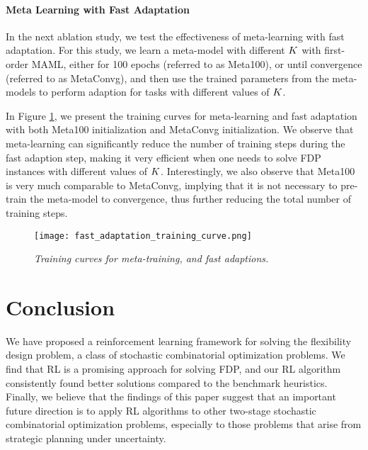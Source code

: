 \documentclass{article} %
\begin{document}
\paragraph{Meta Learning with Fast Adaptation}
In the next ablation study, we test the effectiveness of meta-learning with fast adaptation. For this study, we learn a meta-model with different $K$ with first-order MAML, either for 100 epochs (referred to as Meta100), or until convergence (referred to as MetaConvg), and then use the trained parameters from the meta-models to perform adaption for tasks with different values of $K$.


In Figure \ref{fig:metaltrainingcurve}, we present the training curves for meta-learning and fast adaptation with both Meta100 initialization and MetaConvg initialization. We observe that meta-learning can significantly reduce the number of training steps during the fast adaption step, making it very efficient when one needs to solve FDP instances with different values of $K$. Interestingly, we also observe that Meta100 is very much comparable to MetaConvg, implying that it is not necessary to pre-train the meta-model to convergence, thus further reducing the total number of training steps.




\begin{figure}[htp]
\centering
  \texttt{[image: fast\_adaptation\_training\_curve.png]}
\caption{\textit{Training curves for meta-training, and fast adaptions.}  \label{fig:metaltrainingcurve}}
\vspace{-6mm}
\end{figure}









\section{Conclusion}

We have proposed a reinforcement learning framework for solving the flexibility design problem, a class of stochastic combinatorial optimization problems. We find that RL is a promising approach for solving FDP, and our RL algorithm consistently found better solutions compared to the benchmark heuristics. Finally, we believe that the findings of this paper suggest that an important future direction is to apply RL algorithms to other two-stage stochastic combinatorial optimization problems, especially to those problems that arise from strategic planning under uncertainty.
\end{document}
